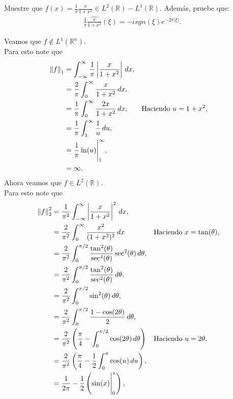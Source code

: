 \begin{homeworkProblem}
  Muestre que $f(x)=\frac{1}{\pi}\frac{x}{1+x^2}\in L^2(\mathbb{R})-L^1(\mathbb{R})$. Además, pruebe que:
  \begin{align*}
    \frac{1}{\pi}\hat{\frac{x}{1+x^2}}(\xi)=-isgn(\xi)e^{-2\pi|\xi|}.
  \end{align*}
  \begin{solution}
    Veamos que $f\notin L^{1}(\mathbb{R}^{n})$.\\
    Para esto note que
    \begin{align*}
      \left\|f\right\|_{1}&=\int_{-\infty}^{\infty}\frac{1}{\pi}\left| \frac{x}{1+x^2} \right|\, dx,\\
      &=\frac{2}{\pi}\int_{0}^{\infty}\frac{x}{1+x^2}\, dx,\\
      &=\frac{1}{\pi}\int_{0}^{\infty}\frac{2x}{1+x^{2}}\, dx, &&\text{Haciendo $u=1+x^{2}$,}\\
      &=\frac{1}{\pi}\int_{1}^{\infty}\frac{1}{u}\, du,\\
      &=\frac{1}{\pi}\ln(u)\Bigg|_{1}^{\infty},\\
      &=\infty.
    \end{align*}
    Ahora veamos que $f\in L^{2}(\mathbb{R})$.\\
    Para esto note que
    \begin{align*}
      \norm{f}_{2}^2&=\frac{1}{\pi^{2}}\int_{-\infty}^{\infty}\left| \frac{x}{1+x^2} \right|^{2}\, dx,\\
      &=\frac{2}{\pi^2}\int_{0}^{\infty}\frac{x^2}{(1+x^2)^2}\, dx &&\text{Haciendo $x=\tan(\theta)$,}\\
      &=\frac{2}{\pi^2}\int_{0}^{\pi/2}\frac{\tan^2(\theta)}{\sec^{4}(\theta)}\sec^{2}(\theta)\, d\theta,\\
      &=\frac{2}{\pi^2}\int_{0}^{\pi/2}\frac{\tan^{2}(\theta)}{\sec^2(\theta)}\, d\theta,\\
      &=\frac{2}{\pi^{2}}\int_{0}^{\pi/2}\sin^2(\theta)\, d\theta,\\
      &=\frac{2}{\pi^{2}}\int_{0}^{\pi/2}\frac{1-\cos(2\theta)}{2}\, d\theta,\\
      &=\frac{2}{\pi^{2}}\left( \frac{\pi}{4}-\int_{0}^{\pi/2}\cos(2\theta)\, d\theta \right)&&\text{Haciendo $u=2\theta$},\\
      &=\frac{2}{\pi^2}\left( \frac{\pi}{4}-\frac{1}{2}\int_{0}^{\pi}\cos(u)\, du \right),\\
      &=\frac{1}{2\pi}-\frac{1}{2}\left( \sin(x)\Bigg|_{0}^{\pi} \right),\\

\end{align*}
\end{solution}
\end{homeworkProblem}

